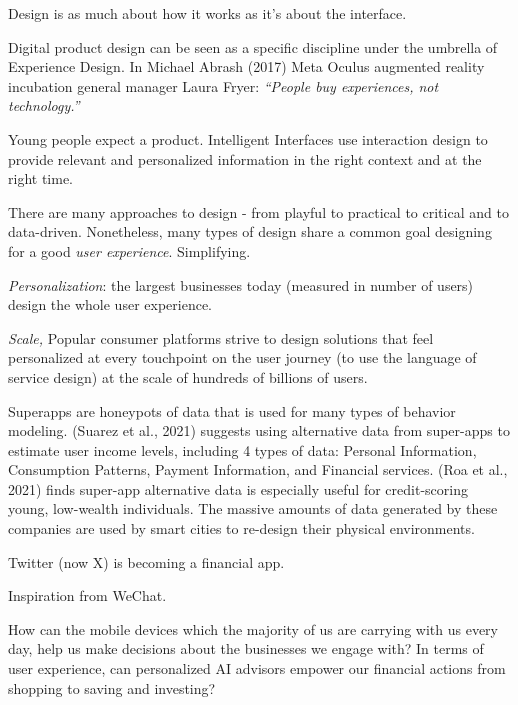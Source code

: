 \documentclass[
  letterpaper,
  DIV=11,
  numbers=noendperiod]{scrartcl}
\begin{document}
Design is as much about how it works as it's about the interface.

Digital product design can be seen as a specific discipline under the
umbrella of Experience Design. In Michael Abrash (2017) Meta Oculus
augmented reality incubation general manager Laura Fryer: \emph{``People
buy experiences, not technology.''}

Young people expect a product. Intelligent Interfaces use interaction
design to provide relevant and personalized information in the right
context and at the right time.

There are many approaches to design - from playful to practical to
critical and to data-driven. Nonetheless, many types of design share a
common goal designing for a good \emph{user experience}. Simplifying.

\emph{Personalization}: the largest businesses today (measured in number
of users) design the whole user experience.

\emph{Scale,} Popular consumer platforms strive to design solutions that
feel personalized at every touchpoint on the user journey (to use the
language of service design) at the scale of hundreds of billions of
users.

Superapps are honeypots of data that is used for many types of behavior
modeling. (Suarez et al., 2021) suggests using alternative data from
super-apps to estimate user income levels, including 4 types of data:
Personal Information, Consumption Patterns, Payment Information, and
Financial services. (Roa et al., 2021) finds super-app alternative data
is especially useful for credit-scoring young, low-wealth individuals.
The massive amounts of data generated by these companies are used by
smart cities to re-design their physical environments.

Twitter (now X) is becoming a financial app.

Inspiration from WeChat.

How can the mobile devices which the majority of us are carrying with us
every day, help us make decisions about the businesses we engage with?
In terms of user experience, can personalized AI advisors empower our
financial actions from shopping to saving and investing?
\end{document}
